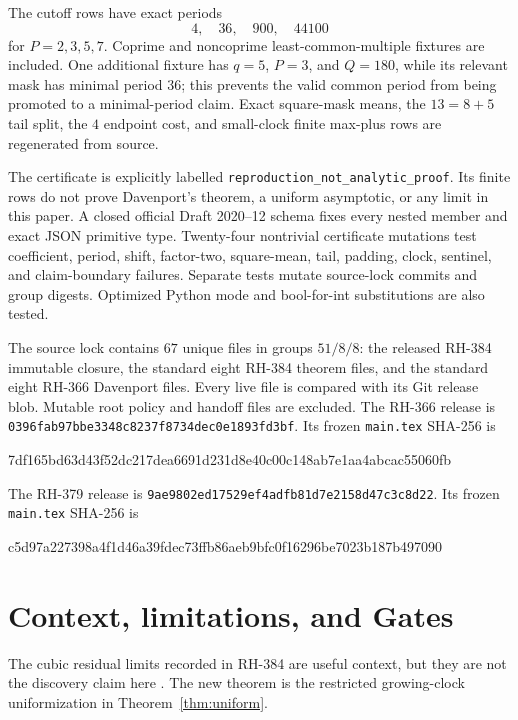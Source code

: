 \documentclass[11pt]{article}
\theoremstyle{definition}
\theoremstyle{remark}
\begin{document}
The cutoff rows have exact periods
\[
                         4,\quad36,\quad900,\quad44100
\]
for $P=2,3,5,7$.  Coprime and noncoprime least-common-multiple fixtures are
included.  One additional fixture has $q=5$, $P=3$, and $Q=180$, while its
relevant mask has minimal period $36$; this prevents the valid common
period from being promoted to a minimal-period claim.  Exact square-mask
means, the $13=8+5$ tail split, the $4$ endpoint cost, and small-clock
finite max-plus rows are regenerated from source.

The certificate is explicitly labelled
\texttt{reproduction\_not\_analytic\_proof}.  Its finite rows do not prove
Davenport's theorem, a uniform asymptotic, or any limit in this paper.  A
closed official Draft 2020--12 schema fixes every nested member and exact
JSON primitive type.  Twenty-four nontrivial certificate mutations test
coefficient, period, shift, factor-two, square-mean, tail, padding, clock,
sentinel, and claim-boundary failures.  Separate tests mutate source-lock
commits and group digests.  Optimized Python mode and bool-for-int
substitutions are also tested.

The source lock contains $67$ unique files in groups $51/8/8$: the released
RH-384 immutable closure, the standard eight RH-384 theorem files, and the
standard eight RH-366 Davenport files.  Every live file is compared with
its Git release blob.  Mutable root policy and handoff files are excluded.
The RH-366 release is
\texttt{0396fab97bbe3348c8237f8734dec0e1893fd3bf}.  Its frozen
\texttt{main.tex} SHA-256 is
\begin{center}
\footnotesize\ttfamily
7df165bd63d43f52dc217dea6691d231d8e40c00c148ab7e1aa4abcac55060fb
\end{center}
The RH-379 release is
\texttt{9ae9802ed17529ef4adfb81d7e2158d47c3c8d22}.  Its frozen
\texttt{main.tex} SHA-256 is
\begin{center}
\footnotesize\ttfamily
c5d97a227398a4f1d46a39fdec73ffb86aeb9bfc0f16296be7023b187b497090
\end{center}

\section{Context, limitations, and Gates}

The cubic residual limits recorded in RH-384 are useful context, but they
are not the discovery claim here \cite{RH384}.  The new theorem is the
restricted growing-clock uniformization in
Theorem~\ref{thm:uniform}.
\end{document}

